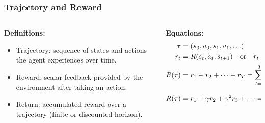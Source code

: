 \begin{frame}
    \frametitle{Trajectory and Reward}
    \begin{columns}[T]
        \begin{column}{0.5\textwidth}
            \textbf{Definitions:}
            \begin{itemize}\setlength{\itemsep}{6pt}
                \item Trajectory: sequence of states and actions the agent experiences over time.
                \item Reward: scalar feedback provided by the environment after taking an action.
                \item Return: accumulated reward over a trajectory (finite or discounted horizon).
            \end{itemize}
        \end{column}
        
        \begin{column}{0.5\textwidth}
            \textbf{Equations:}
            \begin{align*}
                \tau &= (s_0, a_0, s_1, a_1, \ldots) \\
                r_t &= R(s_t, a_t, s_{t+1}) \quad \text{or} \quad r_t = R(s_t, a_t) \\
                R(\tau) &= r_1 + r_2 + \cdots + r_T =
                \sum_{t = 0}^{T} r_t ~ \text{\footnotesize(finite horizon)} \\
                R(\tau) &= r_1 + \gamma r_2 + \gamma^2 r_3 + \cdots =
                \sum_{t = 0}^{\infty} \gamma^t r_t ~ \text{\footnotesize (discounted)}
            \end{align*}
        \end{column}
    \end{columns}
\end{frame}




